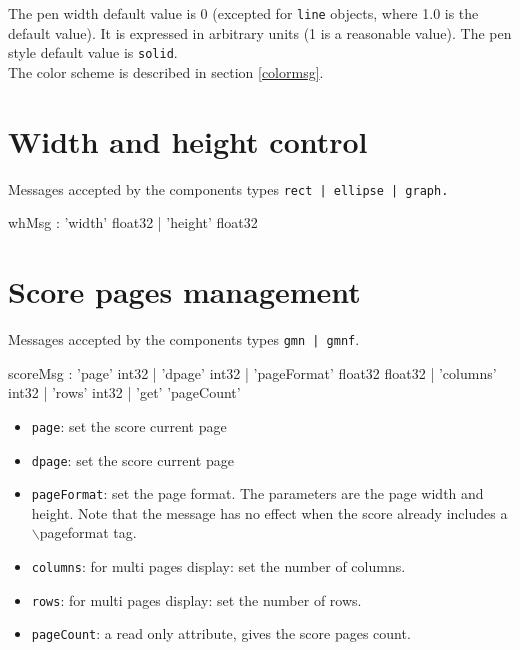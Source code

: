 \documentclass[a4paper,twoside]{report}
\newcommand{\sublevel}[1]	{\section{#1}}
\newcommand{\OSC}[1]		{\texttt{#1}}
\begin{document}
The pen width default value is 0 (excepted for \OSC{line} objects, where 1.0 is the default value). It is expressed in arbitrary units (1 is a reasonable value).
The pen style default value is \OSC{solid}.\\
The color scheme is described in section \ref{colormsg}.


\sublevel{Width and height control}

Messages accepted by the components types \OSC{rect | ellipse | graph.}

\begin{rail}
whMsg : 	  'width' float32
			| 'height' float32
\end{rail}



\sublevel{Score pages management}
\label{gmnpage}

Messages accepted by the components types \OSC{gmn | gmnf}. 
\begin{rail}
scoreMsg :      'page' int32
			| 'dpage' int32
			| 'pageFormat' float32 float32
			| 'columns' int32
			| 'rows' int32
			| 'get' 'pageCount'
\end{rail}


\begin{itemize}
\item \OSC{page}: set the score current page
\item \OSC{dpage}: set the score current page
\item \OSC{pageFormat}: set the page format. The parameters are the page width and height. Note that the message has no effect when the score already includes a $\backslash$pageformat tag.
\item \OSC{columns}: for multi pages display: set the number of columns.
\item \OSC{rows}: for multi pages display: set the number of rows.
\item \OSC{pageCount}:  a read only attribute, gives the score pages count.
\end{itemize}


%
\end{document}
